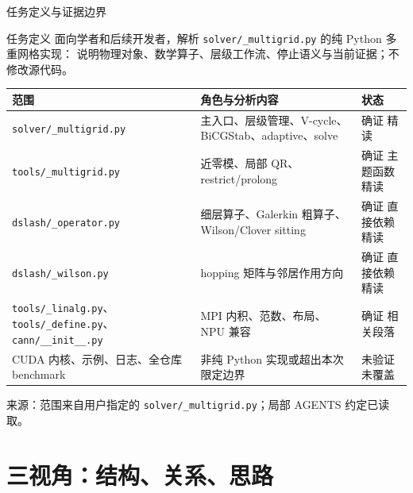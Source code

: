 \documentclass[UTF8,aspectratio=169,11pt]{ctexbeamer}
\newcommand{\source}[1]{%
  \vspace{0.06em}\par{\raggedright\scriptsize\color{muted}来源：#1\par}}
\newcommand{\pathref}[1]{\nolinkurl{#1}}
\newcommand{\verified}{\textcolor{evidence}{确证}}
\newcommand{\unverified}{\textcolor{warn}{未验证}}
\begin{document}
\begin{frame}[t]{任务定义与证据边界}
  \begin{block}{任务定义}
    面向学者和后续开发者，解析 \pathref{solver/_multigrid.py} 的纯 Python 多重网格实现：
    说明物理对象、数学算子、层级工作流、停止语义与当前证据；不修改源代码。
  \end{block}
  \vspace{0.15em}
  \scriptsize
  \begin{center}
    \begin{tabular}{@{}P{0.20\textwidth}P{0.55\textwidth}P{0.18\textwidth}@{}}
      \toprule
      范围 & 角色与分析内容 & 状态 \\
      \midrule
      \pathref{solver/_multigrid.py} & 主入口、层级管理、V-cycle、BiCGStab、adaptive、solve & \verified{} 精读 \\
      \pathref{tools/_multigrid.py} & 近零模、局部 QR、restrict/prolong & \verified{} 主题函数精读 \\
      \pathref{dslash/_operator.py} & 细层算子、Galerkin 粗算子、Wilson/Clover sitting & \verified{} 直接依赖精读 \\
      \pathref{dslash/_wilson.py} & hopping 矩阵与邻居作用方向 & \verified{} 直接依赖精读 \\
      \pathref{tools/_linalg.py}、\pathref{tools/_define.py}、\pathref{cann/__init__.py} & MPI 内积、范数、布局、NPU 兼容 & \verified{} 相关段落 \\
      CUDA 内核、示例、日志、全仓库 benchmark & 非纯 Python 实现或超出本次限定边界 & \unverified{} 未覆盖 \\
      \bottomrule
    \end{tabular}
  \end{center}
  \source{范围来自用户指定的 \pathref{solver/_multigrid.py}；局部 AGENTS 约定已读取。}
\end{frame}

\section{三视角：结构、关系、思路}
\end{document}
